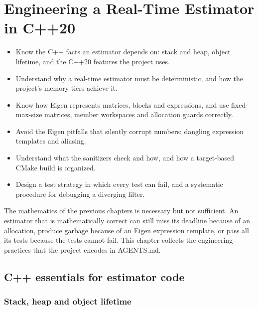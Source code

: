 \chapter{Engineering a Real-Time Estimator in C++20}
\label{ch:engineering}
\sloppy %

\begin{objectives}
\begin{itemize}
  \item Know the C++ facts an estimator depends on: stack and heap, object lifetime, and the C++20 features the project uses.
  \item Understand why a real-time estimator must be deterministic, and how the project's memory tiers achieve it.
  \item Know how Eigen represents matrices, blocks and expressions, and use fixed-max-size matrices, member workspaces and
        allocation guards correctly.
  \item Avoid the Eigen pitfalls that silently corrupt numbers: dangling expression templates and aliasing.
  \item Understand what the sanitizers check and how, and how a target-based CMake build is organized.
  \item Design a test strategy in which every test can fail, and a systematic procedure for debugging a diverging filter.
\end{itemize}
\end{objectives}

The mathematics of the previous chapters is necessary but not sufficient. An estimator that is mathematically correct can still
miss its deadline because of an allocation, produce garbage because of an Eigen expression template, or pass all its tests because
the tests cannot fail. This chapter collects the engineering practices that the project encodes in AGENTS.md.

\section{C++ essentials for estimator code}
\label{sec:cpp-essentials}

\subsection{Stack, heap and object lifetime}

